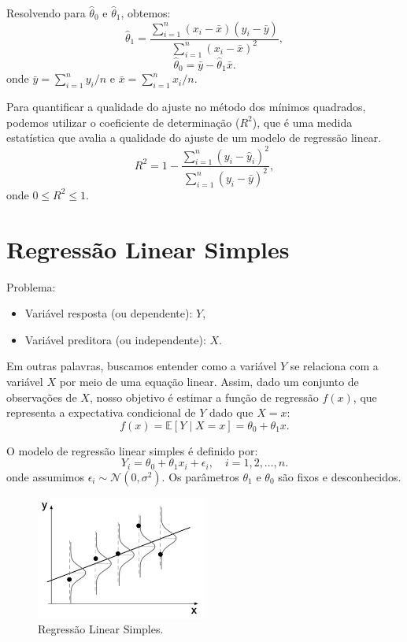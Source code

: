 \documentclass{article}
\begin{document}
Resolvendo para $\hat{\theta}_0$ e $\hat{\theta}_1$, obtemos:
    $$
    \hat{\theta}_1 = \frac{\sum_{i=1}^n (x_i - \bar{x})(y_i - \bar{y})}{\sum_{i=1}^n (x_i - \bar{x})^2},
    $$
    $$
    \hat{\theta}_0 = \bar{y} - \hat{\theta}_1 \bar{x}.
    $$
onde $\bar{y} = \sum_{i=1}^n y_i / n$ e $\bar{x} = \sum_{i=1}^n x_i / n$.

Para quantificar a qualidade do ajuste no método dos mínimos quadrados, podemos utilizar o coeficiente de determinação ($R^2$), que é uma medida estatística que avalia a qualidade do ajuste de um modelo de regressão linear.
    $$
    R^2 = 1 - \frac{\sum_{i=1}^n (y_i - \hat{y}_i)^2}{\sum_{i=1}^n (y_i - \bar{y})^2},
    $$
onde $0 \leq R^2 \leq 1$.

\section{Regressão Linear Simples}
Problema: 
\begin{itemize}
    \item Variável resposta (ou dependente): $Y$,
    \item Variável preditora (ou independente): $X$.
\end{itemize}

Em outras palavras, buscamos entender como a variável $Y$ se relaciona com a variável $X$ por meio de uma equação linear. Assim, dado um conjunto de observações de $X$, nosso objetivo é estimar a função de regressão $f(x)$, que representa a expectativa condicional de $Y$ dado que $X = x$:
    $$
    f(x) = \mathbb{E}[Y \mid X = x] = \theta_0 + \theta_1 x.
    $$

O modelo de regressão linear simples é definido por:
    $$
    Y_i = \theta_0 + \theta_1 x_i + \epsilon_i, \quad i = 1, 2, \ldots, n.
    $$
onde assumimos $\epsilon_i \sim \mathcal{N}(0, \sigma^2)$. Os parâmetros $\theta_1$ e $\theta_0$ são fixos e desconhecidos.

\begin{figure}[H]
    \centering
    \includegraphics[width=0.5\textwidth]{figuras/regressao_linear_simples.png}
    \caption{Regressão Linear Simples.}
    \label{fig:regressao_linear_simples}
\end{figure}
\end{document}

